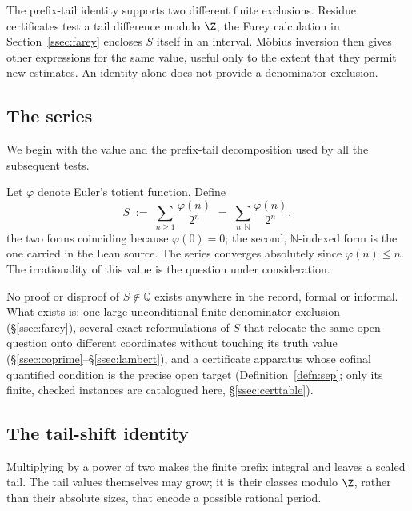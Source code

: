 The prefix-tail identity supports two different finite exclusions.
Residue certificates test a tail difference modulo $\Z$; the Farey
calculation in Section~\ref{ssec:farey} encloses $S$ itself in an
interval. M\"obius inversion then gives other expressions for the
same value, useful only to the extent that they permit new estimates.
An identity alone does not provide a denominator exclusion.

\subsection{The series}

We begin with the value and the prefix-tail decomposition used by
all the subsequent tests.

\begin{defn}
\label{defn:S}
Let $\varphi$ denote Euler's totient function. Define
\[
S \;:=\; \sum_{n \ge 1} \frac{\varphi(n)}{2^{n}} \;=\; \sum_{n : \mathbb{N}} \frac{\varphi(n)}{2^{n}},
\]
the two forms coinciding because $\varphi(0)=0$; the second, $\mathbb{N}$-indexed
form is the one carried in the Lean source. The series converges absolutely
since $\varphi(n)\le n$. The irrationality of this value is the question
under consideration.
\end{defn}

\begin{rem}[Status]
No proof or disproof of $S\notin\mathbb Q$ exists anywhere in the record,
formal or informal. What exists is: one large unconditional finite denominator
exclusion (\S\ref{ssec:farey}), several exact reformulations of $S$ that
relocate the same open question onto different coordinates without touching
its truth value (\S\ref{ssec:coprime}--\S\ref{ssec:lambert}), and a certificate
apparatus whose cofinal quantified condition is the precise open target
(Definition~\ref{defn:sep}; only its finite, checked instances
are catalogued here, \S\ref{ssec:certtable}).
\end{rem}

\subsection{The tail-shift identity}

Multiplying by a power of two makes the finite prefix integral and
leaves a scaled tail. The tail values themselves may grow; it is their
classes modulo $\Z$, rather than their absolute sizes, that encode a
possible rational period.

